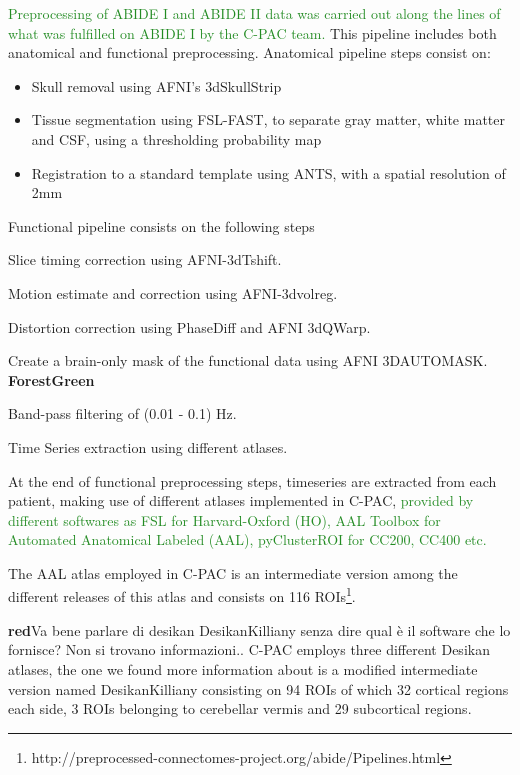 \documentclass[11pt]{report}
\begin{document}
\textcolor{ForestGreen}{Preprocessing of ABIDE I and ABIDE II data was carried out along the lines of what was fulfilled on ABIDE I by the C-PAC team.}
This pipeline includes both anatomical and functional preprocessing.
Anatomical pipeline steps consist on:
\begin{itemize}
\item Skull removal using AFNI's 3dSkullStrip
\item Tissue segmentation using FSL-FAST, to separate gray matter, white matter and CSF, using a thresholding probability map
\item Registration to a standard template using ANTS, with a spatial resolution of 2mm
\end{itemize}
Functional pipeline consists on the following steps
\begin{itemize}
\item Slice timing correction using AFNI-3dTshift.
\item Motion estimate and correction using AFNI-3dvolreg.
\item Distortion correction using PhaseDiff and AFNI 3dQWarp.
\item Create a brain-only mask of the functional data using AFNI 3DAUTOMASK.
\textbf{ForestGreen}{
\item Band-pass filtering of (0.01 - 0.1) Hz.
\item Time Series extraction using different atlases.
}
\end{itemize}

\hfill

At the end of functional preprocessing steps, timeseries are extracted from each patient, making use of different atlases implemented in C-PAC, \textcolor{ForestGreen}{provided by different softwares as FSL for Harvard-Oxford (HO), AAL Toolbox for Automated Anatomical Labeled (AAL), pyClusterROI for CC200, CC400 etc.}

The AAL atlas employed in C-PAC is an intermediate version among the different releases of this atlas and consists on 116 ROIs\footnote{http://preprocessed-connectomes-project.org/abide/Pipelines.html}.

\textbf{red}{Va bene parlare di desikan DesikanKilliany senza dire qual è il software che lo fornisce? Non si trovano informazioni..}
C-PAC employs three different Desikan atlases, the one we found more information about is a modified intermediate version named DesikanKilliany consisting on 94 ROIs of which 32 cortical regions each side, 3 ROIs belonging to cerebellar vermis and 29 subcortical regions.
\end{document}
